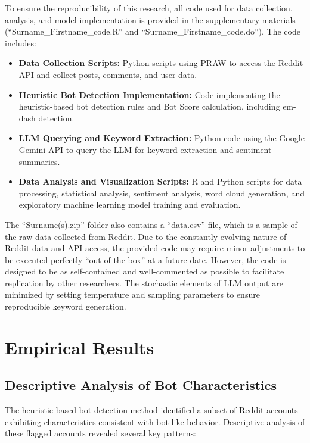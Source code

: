 \documentclass[
  12pt,
  letterpaper,
  DIV=11,
  numbers=noendperiod]{scrartcl}
\providecommand{\tightlist}{%
  \setlength{\itemsep}{0pt}\setlength{\parskip}{0pt}}\usepackage{longtable,booktabs,array}
\begin{document}
To ensure the reproducibility of this research, all code used for data
collection, analysis, and model implementation is provided in the
supplementary materials (``Surname\_Firstname\_code.R'' and
``Surname\_Firstname\_code.do''). The code includes:

\begin{itemize}
\tightlist
\item
  \textbf{Data Collection Scripts:} Python scripts using PRAW to access
  the Reddit API and collect posts, comments, and user data.
\item
  \textbf{Heuristic Bot Detection Implementation:} Code implementing the
  heuristic-based bot detection rules and Bot Score calculation,
  including em-dash detection.
\item
  \textbf{LLM Querying and Keyword Extraction:} Python code using the
  Google Gemini API to query the LLM for keyword extraction and
  sentiment summaries.
\item
  \textbf{Data Analysis and Visualization Scripts:} R and Python scripts
  for data processing, statistical analysis, sentiment analysis, word
  cloud generation, and exploratory machine learning model training and
  evaluation.
\end{itemize}

The ``Surname(s).zip'' folder also contains a ``data.csv'' file, which
is a sample of the raw data collected from Reddit. Due to the constantly
evolving nature of Reddit data and API access, the provided code may
require minor adjustments to be executed perfectly ``out of the box'' at
a future date. However, the code is designed to be as self-contained and
well-commented as possible to facilitate replication by other
researchers. The stochastic elements of LLM output are minimized by
setting temperature and sampling parameters to ensure reproducible
keyword generation.

\section{Empirical Results}\label{empirical-results}

\subsection{Descriptive Analysis of Bot
Characteristics}\label{descriptive-analysis-of-bot-characteristics}

The heuristic-based bot detection method identified a subset of Reddit
accounts exhibiting characteristics consistent with bot-like behavior.
Descriptive analysis of these flagged accounts revealed several key
patterns:
\end{document}
